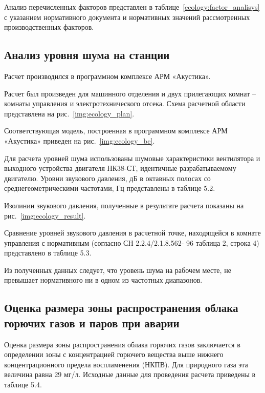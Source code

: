 Анализ перечисленных факторов представлен в таблице~\ref{ecology:factor_analisys} с указанием нормативного документа и нормативных значений рассмотренных производственных факторов.

\pagebreak

\subsection{Анализ уровня шума на станции} %
\label{sub:ecology_noise_analisys}

Расчет производился в программном комплексе АРМ «Акустика».

Расчет был произведен для машинного отделения и двух прилегающих комнат – комнаты управления и электротехнического отсека.
Схема расчетной области представлена на рис.~\ref{img:ecology_plan}.

Соответствующая модель, построенная в программном комплексе АРМ «Акустика» приведен на рис.~\ref{img:ecology_bc}.

Для расчета уровней шума использованы шумовые характеристики вентилятора и выходного устройства двигателя НК38-СТ,
идентичные разрабатываемому двигателю. Уровни звукового давления, дБ в октавных полосах со среднегеометрическими частотами, Гц  представлены в таблице 5.2.

\pagebreak

Изолинии звукового давления, полученные в результате расчета показаны на рис.~\ref{img:ecology_result}.

Сравнение уровней звукового давления в расчетной точке, находящейся в комнате управления с нормативным (согласно СН 2.2.4/2.1.8.562-
96 таблица 2, строка 4) представлено в таблице 5.3.

Из полученных данных следует, что уровень шума на рабочем месте, не превышает нормативного ни в одном из частотных диапазонов.

\subsection{Оценка размера зоны распространения облака горючих газов и паров при аварии} %
\label{sub:ecology_cloud}

Оценка размера зоны распространения облака горючих газов заключается в определении зоны с концентрацией горючего вещества выше нижнего концентрационного предела воспламенения (НКПВ). Для природного газа эта величина равна 29 мг/л.
Исходные данные для проведения расчета приведены в таблице 5.4.

